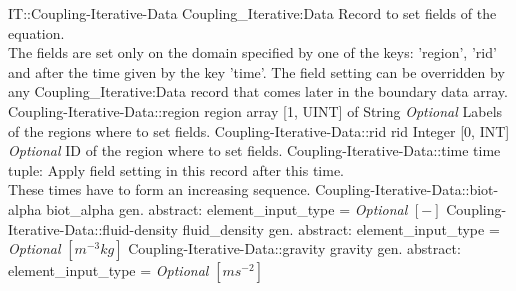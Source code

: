 \begin{RecordType}
	{IT::Coupling-Iterative-Data}
	{Coupling{\_}Iterative:Data}
	{}%
	{}%
	{{{Record to set fields of the equation.}\\{
The fields are set only on the domain specified by one of the keys: 'region', 'rid'}\\{
and after the time given by the key 'time'. The field setting can be overridden by}\\{
 any Coupling{\_}Iterative:Data record that comes later in the boundary data array.}%
}}
		\RecKey
			{Coupling-Iterative-Data::region}
			{region}
			{{array [1, UINT] of }{String}}{}
			{ \it{Optional}}
			{{{Labels of the regions where to set fields. }%
}}
		\RecKey
			{Coupling-Iterative-Data::rid}
			{rid}
			{{Integer [0, INT]}}{}
			{ \it{Optional}}
			{{{ID of the region where to set fields.}%
}}
		\RecKey
			{Coupling-Iterative-Data::time}
			{time}
			{{tuple: }}{}
			{ }
			{{{Apply field setting in this record after this time.}\\{
These times have to form an increasing sequence.}%
}}
		\RecKey
			{Coupling-Iterative-Data::biot-alpha}
			{biot{\_}alpha}
			{{gen. abstract: }}{{element{\_}input{\_}type}{ = }}
			{ \it{Optional}}
			{{{}{$[-]$}%
}}
		\RecKey
			{Coupling-Iterative-Data::fluid-density}
			{fluid{\_}density}
			{{gen. abstract: }}{{element{\_}input{\_}type}{ = }}
			{ \it{Optional}}
			{{{}{$[m^{-3}kg]$}%
}}
		\RecKey
			{Coupling-Iterative-Data::gravity}
			{gravity}
			{{gen. abstract: }}{{element{\_}input{\_}type}{ = }}
			{ \it{Optional}}
			{{{}{$[ms^{-2}]$}%
}}
\end{RecordType}
